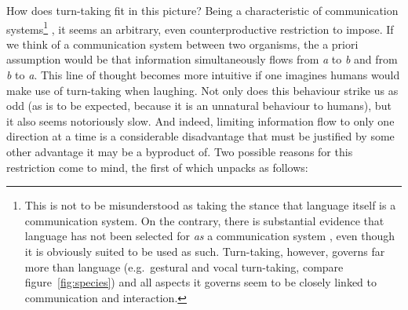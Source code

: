 How does turn-taking fit in this picture?
Being a characteristic of communication systems\footnote{%
This is not to be misunderstood as taking the stance that language itself is a communication system.
On the contrary, there is substantial evidence that language has not been selected for \emph{as} a communication system \citep{reboul_why_2015}, even though it is obviously suited to be used as such. Turn-taking, however, governs far more than language (e.g.~gestural and vocal turn-taking, compare figure~\ref{fig:species}) and all aspects it governs seem to be closely linked to communication and interaction.}%
, it seems an arbitrary, even counterproductive restriction to impose.
If we think of a communication system between two organisms, the a priori assumption would be that information simultaneously flows from \emph{a} to \emph{b} and from \emph{b} to \emph{a}.
This line of thought becomes more intuitive if one imagines humans would make use of turn-taking when laughing.
Not only does this behaviour strike us as odd (as is to be expected, because it is an unnatural behaviour to humans), but it also seems notoriously slow.
And indeed, limiting information flow to only one direction at a time is a considerable disadvantage that must be justified by some other advantage it may be a byproduct of.
Two possible reasons for this restriction come to mind, the first of which unpacks as follows:

